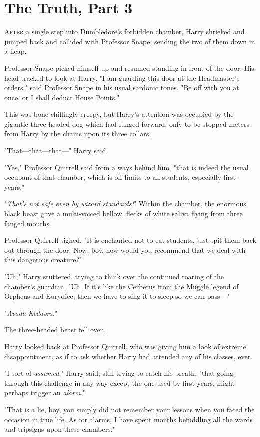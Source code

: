 \chapter{The Truth, Part 3}

\lettrine{A}{fter} a single
step into Dumbledore's forbidden chamber, Harry shrieked and jumped back and
collided with Professor Snape, sending the two of them down in a heap.

Professor Snape picked himself up and resumed standing in front of the door.
His head tracked to look at Harry. "I am guarding this door at the Headmaster's
orders," said Professor Snape in his usual sardonic tones. "Be off with you at
once, or I shall deduct House Points."

This was bone-chillingly creepy, but Harry's attention was occupied by the
gigantic three-headed dog which had lunged forward, only to be stopped meters
from Harry by the chains upon its three collars.

"That—that—that—" Harry said.

"Yes," Professor Quirrell said from a ways behind him, "that is indeed the
usual occupant of that chamber, which is off-limits to all students, especially
first-years."

"\emph{That's not safe even by wizard standards!}" Within the chamber, the
enormous black beast gave a multi-voiced bellow, flecks of white saliva flying
from three fanged mouths.

Professor Quirrell sighed. "It is enchanted not to eat students, just spit them
back out through the door. Now, boy, how would you recommend that we deal with
this dangerous creature?"

"Uh," Harry stuttered, trying to think over the continued roaring of the
chamber's guardian. "Uh. If it's like the Cerberus from the Muggle legend of
Orpheus and Eurydice, then we have to sing it to sleep so we can pass—"

"\emph{Avada Kedavra.}"

The three-headed beast fell over.

Harry looked back at Professor Quirrell, who was giving him a look of extreme
disappointment, as if to ask whether Harry had attended any of his classes,
ever.

"I sort of \emph{assumed}," Harry said, still trying to catch his breath, "that
going through this challenge in any way except the one used by first-years,
might perhaps trigger an \emph{alarm}."

"That is a lie, boy, you simply did not remember your lessons when you faced
the occasion in true life. As for alarms, I have spent months befuddling all
the wards and tripsigns upon these chambers."

